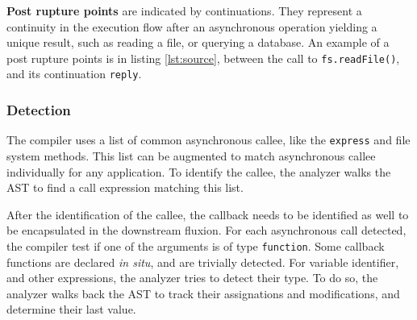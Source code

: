 \textbf{Post rupture points} are indicated by continuations.
They represent a continuity in the execution flow after an asynchronous operation yielding a unique result, such as reading a file, or querying a database.
An example of a post rupture points is in listing \ref{lst:source}, between the call to \texttt{fs.readFile()}, and its continuation \texttt{reply}.


\subsubsection{Detection}

The compiler uses a list of common asynchronous callee, like the \texttt{express} and file system methods.
This list can be augmented to match asynchronous callee individually for any application.
To identify the callee, the analyzer walks the AST to find a call expression matching this list.


After the identification of the callee, the callback needs to be identified as well to be encapsulated in the downstream fluxion.
For each asynchronous call detected, the compiler test if one of the arguments is of type \texttt{function}.
Some callback functions are declared \textit{in situ}, and are trivially detected.
For variable identifier, and other expressions, the analyzer tries to detect their type.
To do so, the analyzer walks back the AST to track their assignations and modifications, and determine their last value.

